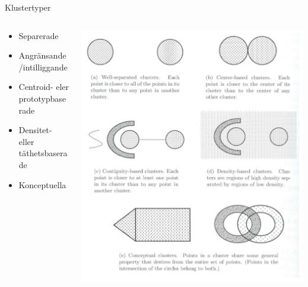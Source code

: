 \documentclass[10pt,english]{beamer}
\begin{document}
\begin{frame}{Klustertyper}
    \begin{columns}
        \begin{column}{0.5\textwidth}
            \begin{itemize}
                \item Separerade
                \item Angränsande/intilliggande
                \item Centroid- eler prototypbaserade
                \item Densitet- eller täthetsbaserade
                \item Konceptuella
            \end{itemize}
        \end{column}
        \begin{column}{0.5\textwidth}
            \includegraphics[width = \textwidth]{figs/Klustertyper.png}
        \end{column}
    \end{columns}
\end{frame}
\end{document}
